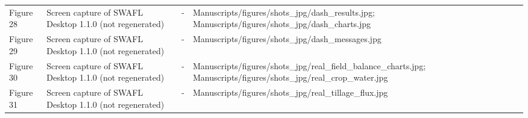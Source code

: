 {\begin{longtable}{p{}p{}p{}p{}}
{}Figure 28 & Screen capture of SWAFL Desktop 1.1.0 (not regenerated) & - & Manuscripts/\allowbreak{}figures/\allowbreak{}shots\_\allowbreak{}jpg/\allowbreak{}dash\_\allowbreak{}results.jpg;  Manuscripts/\allowbreak{}figures/\allowbreak{}shots\_\allowbreak{}jpg/\allowbreak{}dash\_\allowbreak{}charts.jpg\\
{}Figure 29 & Screen capture of SWAFL Desktop 1.1.0 (not regenerated) & - & Manuscripts/\allowbreak{}figures/\allowbreak{}shots\_\allowbreak{}jpg/\allowbreak{}dash\_\allowbreak{}messages.jpg\\
{}Figure 30 & Screen capture of SWAFL Desktop 1.1.0 (not regenerated) & - & Manuscripts/\allowbreak{}figures/\allowbreak{}shots\_\allowbreak{}jpg/\allowbreak{}real\_\allowbreak{}field\_\allowbreak{}balance\_\allowbreak{}charts.jpg;  Manuscripts/\allowbreak{}figures/\allowbreak{}shots\_\allowbreak{}jpg/\allowbreak{}real\_\allowbreak{}crop\_\allowbreak{}water.jpg\\
{}Figure 31 & Screen capture of SWAFL Desktop 1.1.0 (not regenerated) & - & Manuscripts/\allowbreak{}figures/\allowbreak{}shots\_\allowbreak{}jpg/\allowbreak{}real\_\allowbreak{}tillage\_\allowbreak{}flux.jpg\\
\bottomrule\end{longtable}}
